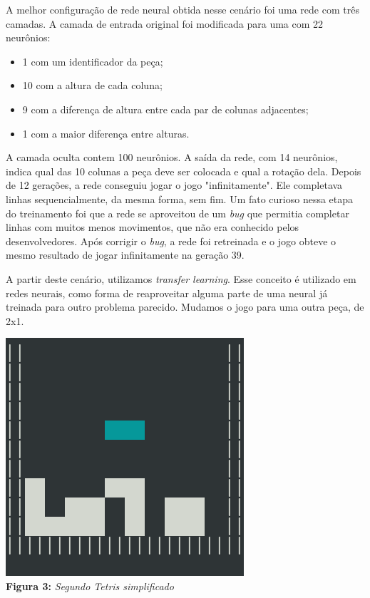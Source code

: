 \documentclass[conference]{IEEEtran}
\begin{document}
A melhor configuração de rede neural obtida nesse cenário foi uma rede com três camadas. A camada de entrada original foi modificada para uma com 22 neurônios: 

\begin{itemize}
\item 1 com um identificador da peça;
\item 10 com a altura de cada coluna;
\item 9 com a diferença de altura entre cada par de colunas adjacentes;
\item 1 com a maior diferença entre alturas.
\end{itemize}

A camada oculta contem 100 neurônios. A saída da rede, com 14 neurônios, indica qual das 10 colunas a peça deve ser colocada e qual a rotação dela. Depois de 12 gerações, a rede conseguiu jogar o jogo "infinitamente". Ele completava linhas sequencialmente, da mesma forma, sem fim. Um fato curioso nessa etapa do treinamento foi que a rede se aproveitou de um \textit{bug} que permitia completar linhas com muitos menos movimentos, que não era conhecido pelos desenvolvedores. Após corrigir o \textit{bug}, a rede foi retreinada e o jogo obteve o mesmo resultado de jogar infinitamente na geração 39.

A partir deste cenário, utilizamos \textit{transfer learning}. Esse conceito é utilizado em redes neurais, como forma de reaproveitar alguma parte de uma neural já treinada para outro problema parecido. Mudamos o jogo para uma outra peça, de 2x1.

\begin{center}
\includegraphics[scale=0.3]{tetris_simples2.png}\\

\textbf{Figura 3:} \textit{Segundo Tetris simplificado}
\end{center}
\end{document}
